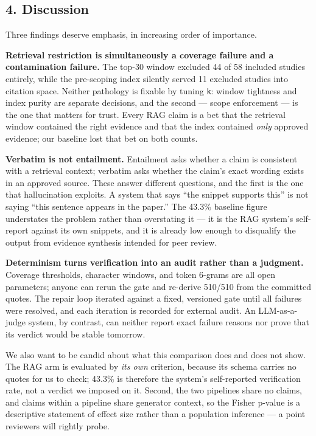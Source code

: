 \documentclass[11pt]{article}
\begin{document}
\subsection{4. Discussion}\label{discussion}

Three findings deserve emphasis, in increasing order of importance.

\textbf{Retrieval restriction is simultaneously a coverage failure and a
contamination failure.} The top-30 window excluded 44 of 58 included
studies entirely, while the pre-scoping index silently served 11
excluded studies into citation space. Neither pathology is fixable by
tuning \texttt{k}: window tightness and index purity are separate
decisions, and the second --- scope enforcement --- is the one that
matters for trust. Every RAG claim is a bet that the retrieval window
contained the right evidence and that the index contained \emph{only}
approved evidence; our baseline lost that bet on both counts.

\textbf{Verbatim is not entailment.} Entailment asks whether a claim is
consistent with a retrieval context; verbatim asks whether the claim's
exact wording exists in an approved source. These answer different
questions, and the first is the one that hallucination exploits. A
system that says ``the snippet supports this'' is not saying ``this
sentence appears in the paper.'' The 43.3\% baseline figure understates
the problem rather than overstating it --- it is the RAG system's
self-report against its own snippets, and it is already low enough to
disqualify the output from evidence synthesis intended for peer review.

\textbf{Determinism turns verification into an audit rather than a
judgment.} Coverage thresholds, character windows, and token 6-grams are
all open parameters; anyone can rerun the gate and re-derive 510/510
from the committed quotes. The repair loop iterated against a fixed,
versioned gate until all failures were resolved, and each iteration is
recorded for external audit. An LLM-as-a-judge system, by contrast, can
neither report exact failure reasons nor prove that its verdict would be
stable tomorrow.

We also want to be candid about what this comparison does and does not
show. The RAG arm is evaluated by \emph{its own} criterion, because its
schema carries no quotes for us to check; 43.3\% is therefore the
system's self-reported verification rate, not a verdict we imposed on
it. Second, the two pipelines share no claims, and claims within a
pipeline share generator context, so the Fisher p-value is a descriptive
statement of effect size rather than a population inference --- a point
reviewers will rightly probe.
\end{document}
